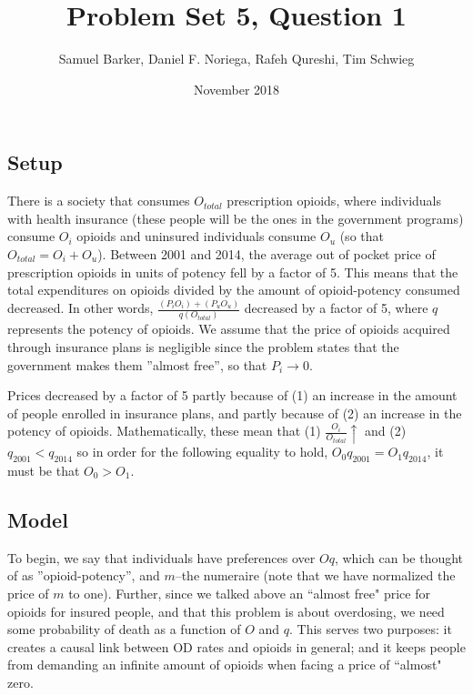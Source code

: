 \documentclass{article}
\title{Problem Set 5, Question 1}
\author{Samuel Barker, Daniel F. Noriega, Rafeh Qureshi, Tim Schwieg}
\date{November 2018}
\begin{document}
\maketitle

\subsection*{Setup}
There is a society that consumes $O_{total}$ prescription opioids, where individuals with health insurance (these people will be the ones in the government programs) consume $O_i$ opioids and uninsured individuals consume $O_u$ (so that $O_{total} = O_i + O_u$). Between 2001 and 2014, the average out of pocket price of prescription opioids in units of potency fell by a factor of 5. This means that the total expenditures on opioids divided by the amount of opioid-potency consumed decreased. In other words, $\frac{(P_iO_i)+(P_uO_u)}{q(O_{total})}$ decreased by a factor of 5, where $q$ represents the potency of opioids. We assume that the price of opioids acquired through insurance plans is negligible since the problem states that the government makes them ''almost free'', so that $P_i \rightarrow 0$.\par
\vspace{1em}
Prices decreased by a factor of 5 partly because of (1) an increase in the amount of people enrolled in insurance plans, and partly because of (2) an increase in the potency of opioids. Mathematically, these mean that (1) $\frac{O_i}{O_{total}} \uparrow$ and (2) $q_{2001} < q_{2014}$ so in order for the following equality to hold, $O_{0} q_{2001}=O_{1}q_{2014}$, it must be that $O_{0}>O_{1}$.

\subsection*{Model}
To begin, we say that individuals have preferences over $Oq$, which can be thought of as ''opioid-potency'', and $m$--the numeraire (note that we have normalized the price of $m$ to one). Further, since we talked above an ``almost free" price for opioids for insured people, and that this problem is about overdosing, we need some probability of death as a function of $O$ and $q$. This serves two purposes: it creates a causal link between OD rates and opioids in general; and it keeps people from demanding an infinite amount of opioids when facing a price of ``almost" zero.
\\
\end{document}

